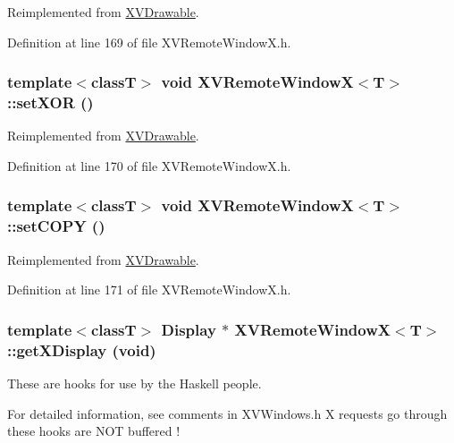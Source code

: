 Reimplemented from \hyperlink{class_XVDrawable}{XVDrawable}.

Definition at line 169 of file XVRemote\-Window\-X.h.\label{XVRemoteWindowX_a28}
\hypertarget{class_XVRemoteWindowX_a28}{
\subsubsection[setXOR]{\setlength{\rightskip}{0pt plus 5cm}template$<$classT$>$ void XVRemote\-Window\-X$<$T$>$::set\-XOR ()}}




Reimplemented from \hyperlink{class_XVDrawable}{XVDrawable}.

Definition at line 170 of file XVRemote\-Window\-X.h.\label{XVRemoteWindowX_a29}
\hypertarget{class_XVRemoteWindowX_a29}{
\subsubsection[setCOPY]{\setlength{\rightskip}{0pt plus 5cm}template$<$classT$>$ void XVRemote\-Window\-X$<$T$>$::set\-COPY ()}}




Reimplemented from \hyperlink{class_XVDrawable}{XVDrawable}.

Definition at line 171 of file XVRemote\-Window\-X.h.\label{XVRemoteWindowX_a30}
\hypertarget{class_XVRemoteWindowX_a30}{
\subsubsection[getXDisplay]{\setlength{\rightskip}{0pt plus 5cm}template$<$classT$>$ Display $\ast$ XVRemote\-Window\-X$<$T$>$::get\-XDisplay (void)}}


These are hooks for use by the Haskell people.

For detailed information, see comments in XVWindows.h X requests go through these hooks are NOT buffered ! 

